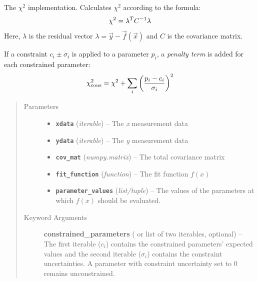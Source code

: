 \documentclass[a4paper,10pt,english]{sphinxmanual}
\begin{document}

\begin{fulllineitems}
\label{module_doc:kafe.fit.chi2}
The \(\chi^2\) implementation. Calculates \(\chi^2\) according
to the formula:
\begin{gather}
\begin{split}\chi^2 = \lambda^T C^{-1} \lambda\end{split}\notag
\end{gather}
Here, \(\lambda\) is the residual vector \(\lambda = \vec{y} -
\vec{f}(\vec{x})\) and \(C\) is the covariance matrix.

If a constraint \(c_i\pm\sigma_i\) is applied to a parameter \(p_i\),
a \emph{penalty term} is added for each constrained parameter:
\begin{gather}
\begin{split}\chi^2_{\text{cons}} = \chi^2 + \sum_i{ \left( \frac{p_i - c_i}{\sigma_i} \right)^2 }\end{split}\notag
\end{gather}\begin{quote}\begin{description}
\item[{Parameters}] \leavevmode\begin{itemize}
\item {} 
\textbf{\texttt{xdata}} (\emph{iterable}) -- The \emph{x} measurement data

\item {} 
\textbf{\texttt{ydata}} (\emph{iterable}) -- The \emph{y} measurement data

\item {} 
\textbf{\texttt{cov\_mat}} (\emph{numpy.matrix}) -- The total covariance matrix

\item {} 
\textbf{\texttt{fit\_function}} (\emph{function}) -- The fit function \(f(x)\)

\item {} 
\textbf{\texttt{parameter\_values}} (\emph{list/tuple}) -- The values of the parameters at which \(f(x)\) should be evaluated.

\end{itemize}

\item[{Keyword Arguments}] \leavevmode
\textbf{constrained\_parameters} ( or list of two iterables, optional) --
The first iterable (\({c_i}\)) contains the constrained parameters'
expected values and the second iterable (\({\sigma_i}\)) contains
the constraint uncertainties. A parameter with constraint uncertainty
set to 0 remains unconstrained.

\end{description}\end{quote}

\end{fulllineitems}
\end{document}
